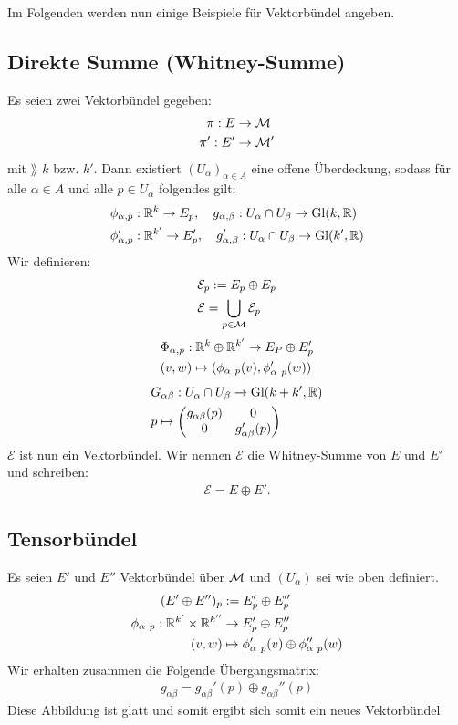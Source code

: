 Im Folgenden werden nun einige Beispiele für Vektorbündel angeben.
\subsection{Direkte Summe (Whitney-Summe)}
Es seien zwei Vektorbündel gegeben:
\begin{align}
\pi : E &\to \mathcal{M} \\
\pi ' : E' & \to \mathcal{M} '
\end{align}
mit $\rang$ $k$ bzw. $k'$. 
Dann existiert $(U_\alpha)_{\alpha \in A}$ eine offene Überdeckung, sodass für alle $\alpha \in A$ und alle $p \in U_\alpha$ folgendes gilt:
\begin{align}
&\phi_{\alpha, p}: \mathbb{R}^k \to E_p, \quad g_{\alpha, \beta}: U_\alpha \cap U_\beta \to \mathrm{Gl}(k, \mathbb{R})\\
&\phi_{\alpha, p}': \mathbb{R}^{k'} \to E_{p}', \quad g_{\alpha, \beta}': U_\alpha \cap U_\beta \to \mathrm{Gl}(k', \mathbb{R})
\end{align}  
Wir definieren:
\begin{align}
&\mathcal{E}_p := E_p \oplus E_{p}\\
&\mathcal{E} = \bigcup_{p \in \mathcal{M}} \mathcal{E}_p
\end{align}
\begin{align}
&\Phi_{\alpha, p}: \mathbb{R}^k \oplus \mathbb{R}^{k'} \to E_P \oplus E_{p}'\\
&(v, w) \mapsto (\phi_{\alpha \ p} (v), \phi_{\alpha \ p}' (w))
\end{align}
\begin{align}
&G_{\alpha \beta}: U_\alpha \cap U_\beta \to \mathrm{Gl}(k + k', \mathbb{R})\\
&p \mapsto \begin{pmatrix}
g_{\alpha \beta}(p)  & 0 \\ 
0  & g_{\alpha \beta}'(p)
\end{pmatrix} 
\end{align}
$\mathcal{E}$ ist nun ein Vektorbündel. 
Wir nennen $\mathcal{E}$ die Whitney-Summe von $E$ und $E'$ und schreiben:
\begin{align}
\mathcal{E} = E \oplus E'.
\end{align} 

\subsection{Tensorbündel}
Es seien $E'$ und $E''$ Vektorbündel über $\mathcal{M}$ und $(U_\alpha)$ sei wie oben definiert.
\begin{align}
(E' \oplus E'')_p &:= E_{p}'\oplus E_{p}''\\
\phi_{\alpha \ p} : \mathbb{R}^{k'} \times \mathbb{R}^{k''} &\to E_{p}' \oplus E_{p}''\\
(v, w) &\mapsto \phi_{\alpha \ p}'(v) \oplus \phi_{\alpha \ p}'' (w)
\end{align}
Wir erhalten zusammen die Folgende Übergangsmatrix:
\begin{align}
g_{\alpha \beta} = g_{\alpha \beta}'(p) \oplus g_{\alpha \beta}''(p)
\end{align}
Diese Abbildung ist glatt und somit ergibt sich somit ein neues Vektorbündel.

